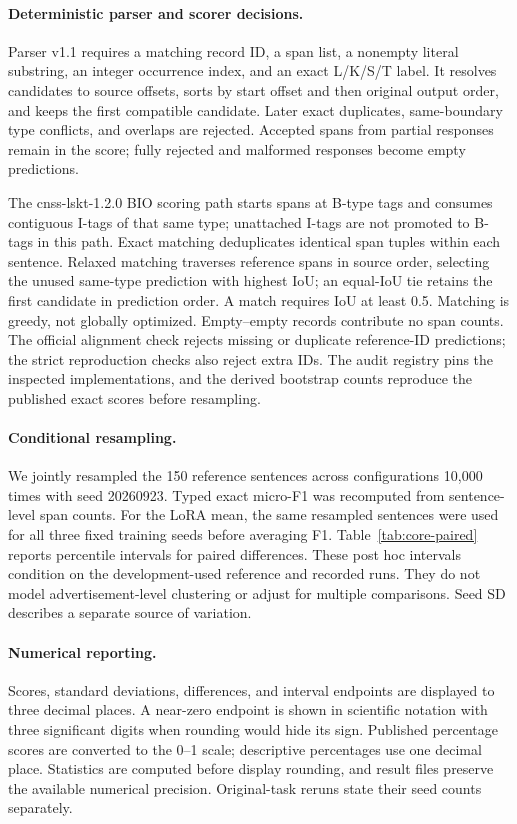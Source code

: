 \paragraph{Deterministic parser and scorer decisions.}
Parser v1.1 requires a matching record ID, a span list, a nonempty literal substring, an integer occurrence index, and an exact L/K/S/T label. It resolves candidates to source offsets, sorts by start offset and then original output order, and keeps the first compatible candidate. Later exact duplicates, same-boundary type conflicts, and overlaps are rejected. Accepted spans from partial responses remain in the score; fully rejected and malformed responses become empty predictions.

The cnss-lskt-1.2.0 BIO scoring path starts spans at B-type tags and consumes contiguous I-tags of that same type; unattached I-tags are not promoted to B-tags in this path. Exact matching deduplicates identical span tuples within each sentence. Relaxed matching traverses reference spans in source order, selecting the unused same-type prediction with highest IoU; an equal-IoU tie retains the first candidate in prediction order. A match requires IoU at least 0.5. Matching is greedy, not globally optimized. Empty--empty records contribute no span counts. The official alignment check rejects missing or duplicate reference-ID predictions; the strict reproduction checks also reject extra IDs. The audit registry pins the inspected implementations, and the derived bootstrap counts reproduce the published exact scores before resampling.

\paragraph{Conditional resampling.}
We jointly resampled the 150 reference sentences across configurations 10,000 times with seed 20260923. Typed exact micro-F1 was recomputed from sentence-level span counts. For the LoRA mean, the same resampled sentences were used for all three fixed training seeds before averaging F1. Table~\ref{tab:core-paired} reports percentile intervals for paired differences. These post hoc intervals condition on the development-used reference and recorded runs. They do not model advertisement-level clustering or adjust for multiple comparisons. Seed SD describes a separate source of variation.

\paragraph{Numerical reporting.}
Scores, standard deviations, differences, and interval endpoints are displayed to three decimal places. A near-zero endpoint is shown in scientific notation with three significant digits when rounding would hide its sign. Published percentage scores are converted to the 0--1 scale; descriptive percentages use one decimal place. Statistics are computed before display rounding, and result files preserve the available numerical precision. Original-task reruns state their seed counts separately.

